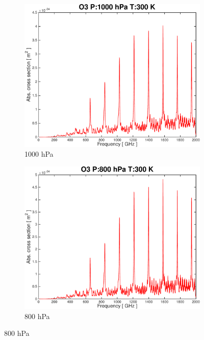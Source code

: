 \documentclass[paper=a4, fontsize=11pt]{scrartcl} %
\begin{document}
\begin{figure}[t!]
    \centering
    \begin{subfigure}[t]{0.45\textwidth}
        \includegraphics[width=\textwidth]{plots/plot_xsec_O3_1000hPa_300K.pdf}
        \caption{1000 hPa}
    \end{subfigure}
    \begin{subfigure}[t]{0.45\textwidth}
        \includegraphics[width=\textwidth]{plots/plot_xsec_O3_800hPa_300K.pdf}
        \caption{800 hPa}
    \end{subfigure}

\end{figure}
\end{document}
